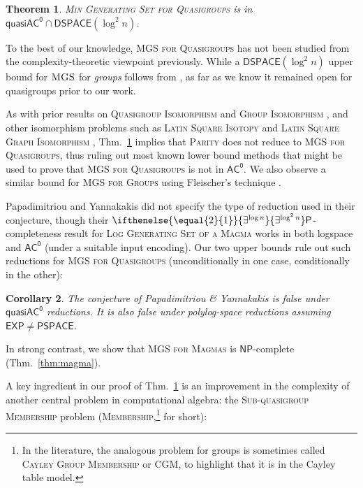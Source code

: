 \documentclass{article}
\newtheorem{theorem}{Theorem}\newtheorem{lemma}[theorem]{Lemma}\newtheorem{proposition}[theorem]{Proposition}\newtheorem{corollary}[theorem]{Corollary}\newtheorem{definition}[theorem]{Definition}\newtheorem{claim}[theorem]{Claim}\newtheorem{remark}[theorem]{Remark}\newtheorem{observation}[theorem]{Observation}\newtheorem{conjecture}[theorem]{Conjecture}\newtheorem{example}[theorem]{Example}
\newcommand{\algprobm}[1]{\textsc{#1}\xspace}
\newcommand{\betacc}[1]{\ifthenelse{\equal{#1}{1}}{\exists^{\log n}}{\exists^{\log^{#1}n}}} %
\newcommand*{\ComplexityClass}[1]{\ensuremath{\mathsf{#1}}\xspace}
\newcommand*{\NP}{\ComplexityClass{NP}}
\renewcommand{\P}{\ComplexityClass{P}}
\newcommand*{\EXP}{\ComplexityClass{EXP}}
\newcommand*{\PSPACE}{\ComplexityClass{PSPACE}}
\newcommand{\ACz}{\ComplexityClass{AC^0}}
\newcommand{\qACz}{\ComplexityClass{quasiAC^0}}
\newcommand{\DSPACE}{\ComplexityClass{DSPACE}}
\begin{document}
\begin{theorem} \label{thm:main-mgsq}
\algprobm{Min Generating Set for Quasigroups} is in $\qACz \cap \DSPACE(\log^2 n)$. 
\end{theorem}


To the best of our knowledge, \algprobm{MGS for Quasigroups} has not been studied from the complexity-theoretic viewpoint previously. While a $\DSPACE(\log^2 n)$ upper bound for $\algprobm{MGS}$ for \emph{groups} follows from \cite{TangThesis, ArvindToran}, as far as we know it remained open for quasigroups prior to our work. 

As with prior results on \algprobm{Quasigroup Isomorphism} and \algprobm{Group Isomorphism} \cite{ChattopadhyayToranWagner}, and other isomorphism problems such as  \algprobm{Latin Square Isotopy} and  \algprobm{Latin Square Graph Isomorphism} \cite{LevetLatinSquares}, Thm.~\ref{thm:main-mgsq} implies that \algprobm{Parity} does not reduce to \algprobm{MGS for Quasigroups}, thus ruling out most known lower bound methods that might be used to prove that \algprobm{MGS for Quasigroups} is not in $\ACz$. We also observe a similar bound for \algprobm{MGS for Groups} using Fleischer's technique \cite{Fleischer}. 

Papadimitriou and Yannakakis did not specify the type of reduction used in their conjecture, though their $\betacc{2}\P$-completeness result for \algprobm{Log Generating Set of a Magma} works in both logspace and $\ACz$ (under a suitable input encoding). Our two upper bounds rule out such reductions for \algprobm{MGS for Quasigroups} (unconditionally in one case, conditionally in the other):

\begin{corollary}
The conjecture of Papadimitriou \& Yannakakis \cite[p.~169]{PY} is false under $\qACz$ reductions. It is also false under polylog-space reductions assuming $\EXP \neq \PSPACE$.
\end{corollary}

In strong contrast, we show that \algprobm{MGS for Magmas} is \NP-complete (Thm.~\ref{thm:magma}).

A key ingredient in our proof of Thm.~\ref{thm:main-mgsq} is an improvement in the complexity of another central problem in computational algebra: the \algprobm{Sub-quasigroup Membership} problem (\algprobm{Membership},\footnote{In the literature, the analogous problem for groups is sometimes called \algprobm{Cayley Group Membership} or \algprobm{CGM}, to highlight that it is in the Cayley table model.} for short):
\end{document}
